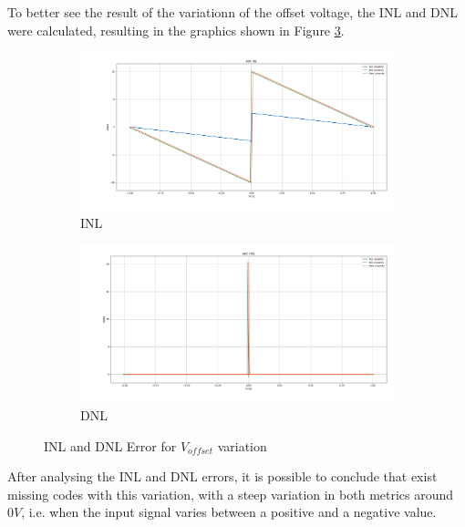 To better see the result of the variationn of the offset voltage, the INL and DNL were calculated, resulting in the graphics shown in Figure \ref{fig:NL_Voffset}.


\begin{figure}[H]
    \centering
    \begin{subfigure}[b]{0.8\textwidth}
        \centering
        \includegraphics[width=\textwidth]{Images/INL_Voffset.png}
        \caption{INL}
        \label{fig:INL_Voffset}
    \end{subfigure}%
    
    \begin{subfigure}[b]{0.8\textwidth}
        \centering
        \includegraphics[width=\textwidth]{Images/DNL_Voffset.png}
        \caption{DNL}
        \label{fig:DNL_Voffset}
    \end{subfigure}
    \caption{INL and DNL Error for $V_{offset}$ variation}
    \label{fig:NL_Voffset}
\end{figure}

After analysing the INL and DNL errors, it is possible to conclude that exist missing codes with this variation, with a steep variation in both metrics around $0V$, i.e. when the input signal varies between a positive and a negative value.

